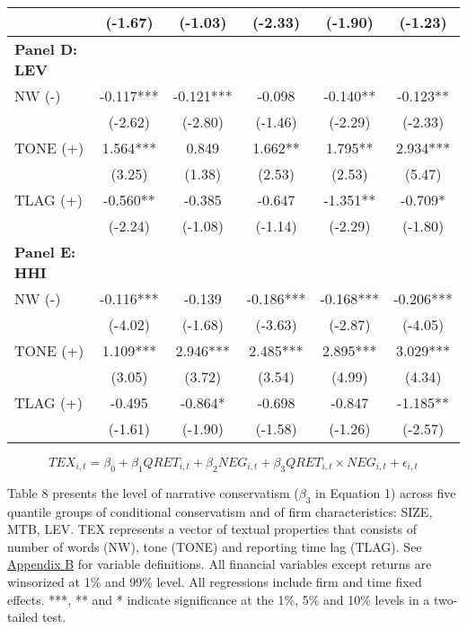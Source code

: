 \begin{table}[H]
\begin{center}
\begin{tabular}{lccccc}
			& (-1.67) & (-1.03) & (-2.33) & (-1.90) & (-1.23) \\
			\midrule
			\textbf{Panel D: LEV} &   &   &   &   &  \\
			\midrule
			NW (-) & -0.117*** & -0.121*** & -0.098 & -0.140** & -0.123** \\
			& (-2.62) & (-2.80) & (-1.46) & (-2.29) & (-2.33) \\
			TONE (+) & 1.564*** & 0.849 & 1.662** & 1.795** & 2.934*** \\
			& (3.25) & (1.38) & (2.53) & (2.53) & (5.47) \\
			TLAG (+) & -0.560** & -0.385 & -0.647 & -1.351** & -0.709* \\
			& (-2.24) & (-1.08) & (-1.14) & (-2.29) & (-1.80) \\
			\midrule
			\textbf{Panel E: HHI} &   &   &   &   &  \\
			\midrule
			NW (-) & -0.116*** & -0.139 & -0.186*** & -0.168*** & -0.206*** \\
			& (-4.02) & (-1.68) & (-3.63) & (-2.87) & (-4.05) \\
			TONE (+) & 1.109*** & 2.946*** & 2.485*** & 2.895*** & 3.029*** \\
			& (3.05) & (3.72) & (3.54) & (4.99) & (4.34) \\
			TLAG (+) & -0.495 & -0.864* & -0.698 & -0.847 & -1.185** \\
			& (-1.61) & (-1.90) & (-1.58) & (-1.26) & (-2.57) \\
			\bottomrule
			\bottomrule
		\end{tabular}%
	\end{center}
		\begin{footnotesize}
			\setcounter{equation}{0}
			\begin{equation}
				TEX_{i,t}=\beta_0+\beta_1QRET_{i,t}+\beta_2NEG_{i,t}+\beta_3QRET_{i,t}\times NEG_{i,t}+\epsilon_{i,t}
			\end{equation}
			
			\noindent Table 8 presents the level of narrative conservatism ($\beta_3$ in Equation 1) across five quantile groups of conditional conservatism and of firm characteristics: SIZE, MTB, LEV. TEX represents a vector of textual properties that consists of number of words (NW), tone (TONE) and reporting time lag (TLAG). See \hyperref[appb]{Appendix B} for variable definitions. All financial variables except returns are winsorized at 1\% and 99\% level. All regressions include firm and time fixed effects. ***, ** and * indicate significance at the 1\%, 5\% and 10\% levels in a two-tailed test.
		\end{footnotesize}
\end{table}%
